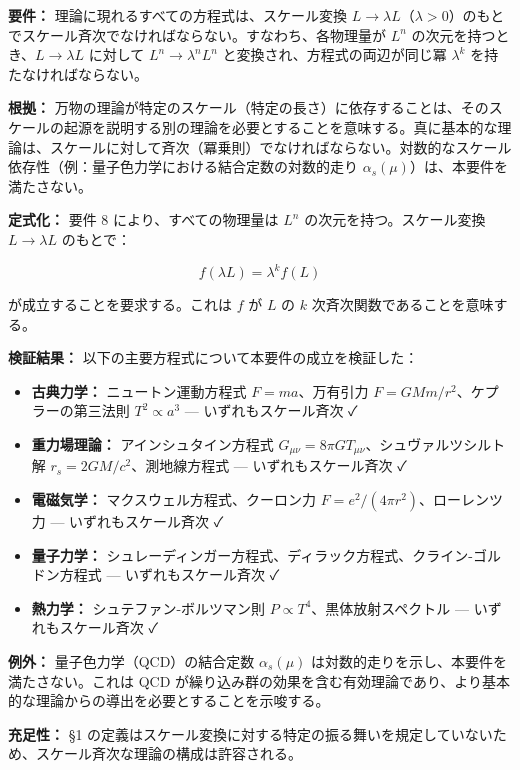 \documentclass[a4paper,11pt]{ltjsarticle}
\providecommand{\tightlist}{\setlength{\itemsep}{0pt}\setlength{\parskip}{0pt}}
\begin{document}
\textbf{要件：} 理論に現れるすべての方程式は、スケール変換
\(L \to \lambda L\)（\(\lambda > 0\)）のもとでスケール斉次でなければならない。すなわち、各物理量が
\(L^n\) の次元を持つとき、\(L \to \lambda L\) に対して
\(L^n \to \lambda^n L^n\) と変換され、方程式の両辺が同じ冪 \(\lambda^k\)
を持たなければならない。

\textbf{根拠：}
万物の理論が特定のスケール（特定の長さ）に依存することは、そのスケールの起源を説明する別の理論を必要とすることを意味する。真に基本的な理論は、スケールに対して斉次（冪乗則）でなければならない。対数的なスケール依存性（例：量子色力学における結合定数の対数的走り
\(\alpha_s(\mu)\)）は、本要件を満たさない。

\textbf{定式化：} 要件 8 により、すべての物理量は \(L^n\)
の次元を持つ。スケール変換 \(L \to \lambda L\) のもとで：

\[f(\lambda L) = \lambda^k f(L)\]

が成立することを要求する。これは \(f\) が \(L\) の \(k\)
次斉次関数であることを意味する。

\textbf{検証結果：} 以下の主要方程式について本要件の成立を検証した：

\begin{itemize}
\tightlist
\item
  \textbf{古典力学：} ニュートン運動方程式 \(F = ma\)、万有引力
  \(F = GMm/r^2\)、ケプラーの第三法則 \(T^2 \propto a^3\) ---
  いずれもスケール斉次 ✓
\item
  \textbf{重力場理論：} アインシュタイン方程式
  \(G_{\mu\nu} = 8\pi G T_{\mu\nu}\)、シュヴァルツシルト解
  \(r_s = 2GM/c^2\)、測地線方程式 --- いずれもスケール斉次 ✓
\item
  \textbf{電磁気学：} マクスウェル方程式、クーロン力
  \(F = e^2/(4\pi r^2)\)、ローレンツ力 --- いずれもスケール斉次 ✓
\item
  \textbf{量子力学：}
  シュレーディンガー方程式、ディラック方程式、クライン-ゴルドン方程式
  --- いずれもスケール斉次 ✓
\item
  \textbf{熱力学：} シュテファン-ボルツマン則
  \(P \propto T^4\)、黒体放射スペクトル --- いずれもスケール斉次 ✓
\end{itemize}

\textbf{例外：} 量子色力学（QCD）の結合定数 \(\alpha_s(\mu)\)
は対数的走りを示し、本要件を満たさない。これは QCD
が繰り込み群の効果を含む有効理論であり、より基本的な理論からの導出を必要とすることを示唆する。

\textbf{充足性：} §1
の定義はスケール変換に対する特定の振る舞いを規定していないため、スケール斉次な理論の構成は許容される。
\end{document}

